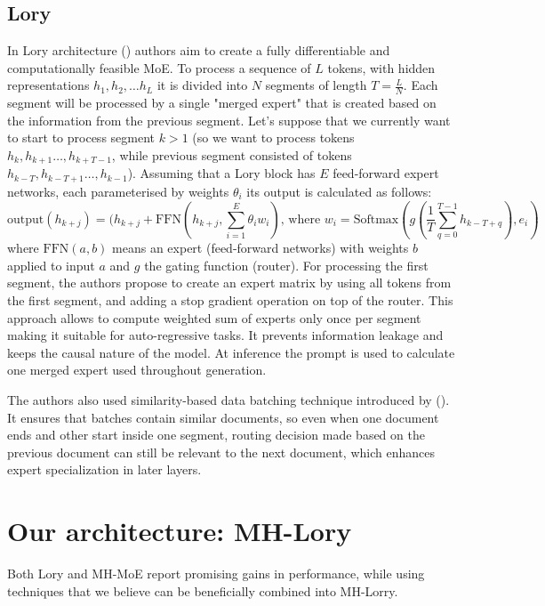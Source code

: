 \documentclass[12pt]{article}
\begin{document}
\subsection{Lory}
In Lory architecture (\cite{zhong2024lory}) authors aim to create a fully differentiable and computationally feasible MoE. To process a sequence of $L$ tokens, with hidden representations $h_1, h_2, \dots h_L$ it is divided into $N$ segments of length $T = \frac{L}{N}$. Each segment will be processed by a single "merged expert" that is created based on the information from the previous segment. Let's suppose that we currently want to start to process segment $k>1$ (so we want to process tokens $h_k, h_{k+1}\dots ,h_{k+T -1}$, while previous segment consisted of tokens $h_{k - T}, h_{k-T+1}\dots ,h_{k-1}$). Assuming that a Lory block has $E$ feed-forward expert networks, each parameterised by weights $\theta_i$ its output is calculated as follows:
\[\text{output}(h_{k + j}) = (h_{k + j} + \text{FFN}(h_{k+j}, \sum_{i=1}^E \theta_i w_i) \text{,   where  } w_i = \text{Softmax}(g(\frac{1}{T}\sum_{q = 0}^{T-1}h_{k-T+q}), e_i)\] where $\text{FFN}(a, b)$ means an expert (feed-forward networks) with weights $b$ applied to input $a$ and $g$ the gating function (router).
For processing the first segment, the authors propose to create an expert matrix by using all tokens from the first segment, and adding a stop gradient operation on top of the router.
This approach allows to compute weighted sum of experts only once per segment making it suitable for auto-regressive tasks. It prevents information leakage and keeps the causal nature of the model.
At inference the prompt is used to calculate one merged expert used throughout generation. 

The authors also used similarity-based data batching technique introduced by (\cite{shi2023context}). 
It ensures that batches contain similar documents, so even when one document ends and other start inside one segment, routing decision made based on the previous document can still be relevant to the next document, which enhances expert specialization in later layers.



\section{Our architecture: MH-Lory}
Both Lory and MH-MoE report promising gains in performance, while using techniques that we believe can be beneficially combined into MH-Lorry. 
\end{document}
